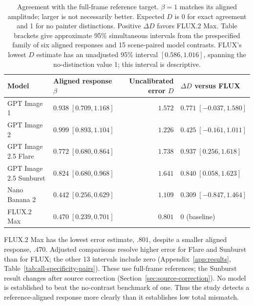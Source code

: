 \begin{table}[tbp]
\caption{Agreement with the full-frame reference target. $\beta=1$ matches its aligned amplitude; larger is not necessarily better. Expected $D$ is 0 for exact agreement and 1 for no painter distinctions. Positive $\Delta D$ favors FLUX.2 Max. Table brackets give approximate 95\% simultaneous intervals from the prespecified family of six aligned responses and 15 scene-paired model contrasts. FLUX's lowest $D$ estimate has an unadjusted 95\% interval $[0.586,1.016]$, spanning the no-distinction value 1; this interval is descriptive.}
\label{tab:specificity-models}

\centering\small\setlength{\tabcolsep}{4pt}
\begin{tabularx}{\linewidth}{@{}>{\raggedright\arraybackslash}p{.24\linewidth}>{\raggedright\arraybackslash}Xr>{\raggedright\arraybackslash}X@{}}
\toprule
Model & Aligned response $\beta$ & \shortstack{Uncalibrated\\error $D$} & $\Delta D$ versus FLUX\\
\midrule
GPT Image 1 & $0.938\;[0.709,1.168]$ & $1.572$ & $0.771\;[-0.037,1.580]$\\[3pt]
GPT Image 2 & $0.999\;[0.893,1.104]$ & $1.226$ & $0.425\;[-0.161,1.011]$\\[3pt]
GPT Image 2.5 Flare & $0.772\;[0.680,0.864]$ & $1.738$ & $0.937\;[0.256,1.618]$\\[3pt]
GPT Image 2.5 Sunburst & $0.824\;[0.680,0.968]$ & $1.641$ & $0.840\;[0.058,1.623]$\\[3pt]
Nano Banana 2 & $0.442\;[0.256,0.629]$ & $1.109$ & $0.309\;[-0.847,1.464]$\\[3pt]
FLUX.2 Max & $0.470\;[0.239,0.701]$ & $0.801$ & $0$ (baseline)\\[3pt]
\bottomrule\end{tabularx}

\end{table}


FLUX.2 Max has the lowest error estimate, $.801$, despite a smaller aligned
response, $.470$. Adjusted comparisons resolve higher error for Flare and Sunburst
than for FLUX; the other 13 intervals include zero (Appendix~\ref{app:results},
Table~\ref{tab:all-specificity-pairs}).
These use full-frame references;
the Sunburst result changes after source correction
(Section~\ref{sec:source-correction}). No model is established to beat the
no-contrast benchmark of one. Thus the study detects a
reference-aligned response more clearly than it establishes low total mismatch.

